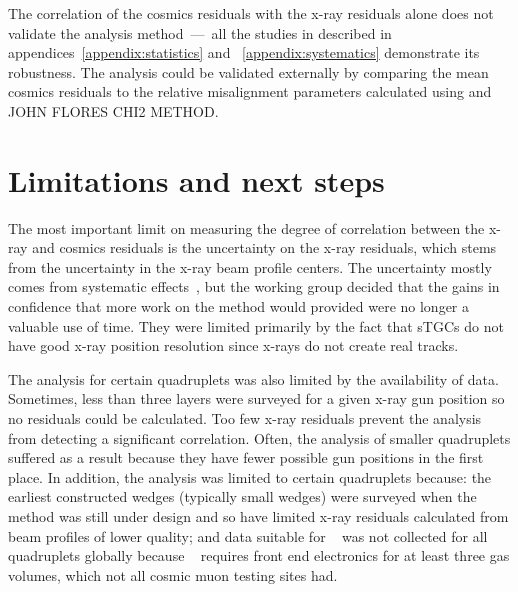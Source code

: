 The correlation of the cosmics residuals with the x-ray residuals alone does not validate the analysis method~---~all the studies in described in appendices~\ref{appendix:statistics} and ~\ref{appendix:systematics} demonstrate its robustness. The analysis could be validated externally by comparing the mean cosmics residuals to the relative misalignment parameters calculated using  and JOHN FLORES CHI2 METHOD.

\section{Limitations and next steps}
The most important limit on measuring the degree of correlation between the x-ray and cosmics residuals is the uncertainty on the x-ray residuals, which stems from the uncertainty in the x-ray beam profile centers. The uncertainty mostly comes from systematic effects~\cite{lefebvre_precision_2020}, but the working group decided that the gains in confidence that more work on the method would provided were no longer a valuable use of time. They were limited primarily by the fact that sTGCs do not have good x-ray position resolution since x-rays do not create real tracks. 

The analysis for certain quadruplets was also limited by the availability of data. Sometimes, less than three layers were surveyed for a given x-ray gun position so no residuals could be calculated. Too few x-ray residuals prevent the analysis from detecting a significant correlation. Often, the analysis of smaller quadruplets suffered as a result because they have fewer possible gun positions in the first place. In addition, the analysis was limited to certain quadruplets because: the earliest constructed wedges (typically small wedges) were surveyed when the method was still under design and so have limited x-ray residuals calculated from beam profiles of lower quality; and data suitable for ~\cite{lefebvre_tgc_analysis} was not collected for all quadruplets globally because ~\cite{lefebvre_tgc_analysis} requires front end electronics for at least three gas volumes, which not all cosmic muon testing sites had.

